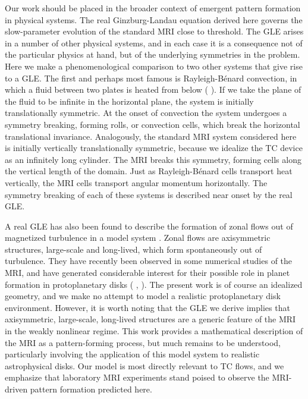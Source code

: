 \documentclass{emulateapj}
\newcommand{\citei}[1]{\citeauthor{#1} \citeyear{#1}}
\begin{document}
Our work should be placed in the broader context of emergent pattern formation in physical systems. The real Ginzburg-Landau equation derived here governs the slow-parameter evolution of the standard MRI close to threshold. The GLE arises in a number of other physical systems, and in each case it is a consequence not of the particular physics at hand, but of the underlying symmetries in the problem. Here we make a phenomenological comparison to two other systems that give rise to a GLE. The first and perhaps most famous is Rayleigh-B\'enard convection, in which a fluid between two plates is heated from below (\citei{Newell:1969wr}). If we take the plane of the fluid to be infinite in the horizontal plane, the system is initially translationally symmetric. 
At the onset of convection the system undergoes a symmetry breaking, forming rolls, or convection cells, which break the horizontal translational invariance. Analogously, the standard MRI system considered here is initially vertically translationally symmetric, because we idealize the TC device as an infinitely long cylinder. The MRI breaks this symmetry, forming cells along the vertical length of the domain. Just as Rayleigh-B\'enard cells transport heat vertically, the MRI cells transport angular momentum horizontally. The symmetry breaking of each of these systems is described near onset by the real GLE. 

A real GLE has also been found to describe the formation of zonal flows out of magnetized turbulence in a model system \citep{Parker:2013hy, Parker:inpress}. Zonal flows are axisymmetric structures, large-scale and long-lived, which form spontaneously out of turbulence. They have recently been observed in some numerical studies of the MRI, and have generated considerable interest for their possible role in planet formation in protoplanetary disks (\citei{Johansen:2009uj}, \citei{Kunz:2013}). The present work is of course an idealized geometry, and we make no attempt to model a realistic protoplanetary disk environment. However, it is worth noting that the GLE we derive implies that axisymmetric, large-scale, long-lived structures are a generic feature of the MRI in the weakly nonlinear regime. This work provides a mathematical description of the MRI as a pattern-forming process, but much remains to be understood, particularly involving the application of this model system to realistic astrophysical disks. Our model is most directly relevant to TC flows, and we emphasize that laboratory MRI experiments stand poised to observe the MRI-driven pattern formation predicted here. 
\end{document}
